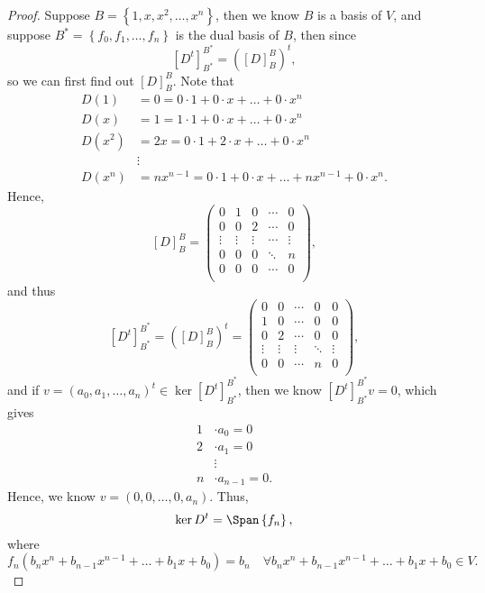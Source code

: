 \begin{proof}
    Suppose \(B=\left\{ 1, x, x^2, \dots , x^n \right\} \), then we know \(B\) is a basis of \(V\), and suppose \(B^* = \left\{ f_0, f_1, \dots , f_n \right\} \) is the dual basis of \(B\), then since 
    \[
        \left[ D^t \right]_{B^*}^{B^*} = \left( [D]_B^B \right)^t, 
    \] so we can first find out \([D]_B^B\). Note that 
    \begin{align*}
        D(1) &= 0 = 0 \cdot 1 + 0 \cdot x + \dots + 0 \cdot x^n \\
        D(x) &= 1 = 1 \cdot 1 + 0 \cdot x + \dots + 0 \cdot x^n \\
        D\left( x^2 \right) &= 2x = 0 \cdot 1 + 2 \cdot x + \dots + 0 \cdot x^n \\
        &\vdots \\
        D \left( x^n \right) &= n x^{n-1} = 0 \cdot 1 + 0 \cdot x + \dots + n x^{n-1} + 0 \cdot x^n.
    \end{align*} 
    Hence, 
    \[
        [D]_B^B = \begin{pmatrix}
            0 & 1 & 0 & \cdots & 0  \\
            0 & 0 & 2 & \cdots & 0  \\
            \vdots & \vdots & \vdots & \cdots & \vdots  \\
            0 & 0 & 0 & \ddots & n  \\
            0 & 0 & 0 & \cdots & 0  \\
        \end{pmatrix},
    \] and thus 
    \[
        \left[ D^t \right]_{B^*}^{B^*} = \left( [D]_B^B \right)^t =
        \begin{pmatrix}
            0 & 0 & \cdots & 0 & 0  \\
            1 & 0 & \cdots & 0 & 0  \\
            0 & 2 & \cdots & 0 & 0 \\
            \vdots & \vdots & \vdots & \ddots & \vdots  \\
            0 & 0 & \cdots & n & 0  \\
        \end{pmatrix},
    \] and if \(v = (a_0, a_1, \dots , a_n)^t \in \ker \left[ D^t \right]_{B^*}^{B^*} \), then we know \(\left[ D^t \right]_{B^*}^{B^*}v = 0\), which gives 
    \begin{align*}
        1 &\cdot a_0 = 0 \\
        2 &\cdot a_1 = 0 \\
        &\vdots \\
        n &\cdot a_{n-1} = 0.
    \end{align*} 
    Hence, we know \(v = (0, 0, \dots , 0, a_n)\). Thus, 
    \[
        \ker D^t = \Span \left\{ f_n \right\}, 
    \] where 
    \[
        f_n \left( b_n x^n + b_{n-1} x^{n-1} + \dots + b_1 x + b_0 \right) = b_n \quad \forall b_n x^n + b_{n-1} x^{n-1} + \dots + b_1 x + b_0 \in V. 
    \]
\end{proof}

